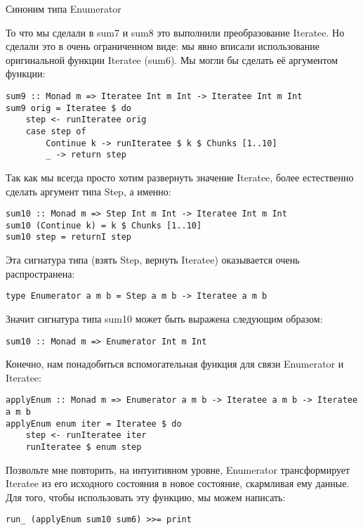 Синоним типа Enumerator

То что мы сделали в sum7 и sum8 это выполнили преобразование Iteratee. Но сделали это в очень ограниченном виде: мы явно вписали использование оригинальной функции Iteratee (sum6). Мы могли бы сделать её аргументом функции:

\begin{lstlisting}
sum9 :: Monad m => Iteratee Int m Int -> Iteratee Int m Int
sum9 orig = Iteratee $ do
    step <- runIteratee orig
    case step of
        Continue k -> runIteratee $ k $ Chunks [1..10]
        _ -> return step
\end{lstlisting}

Так как мы всегда просто хотим развернуть значение Iteratee, более естественно сделать аргумент типа Step, а именно:

\begin{lstlisting}
sum10 :: Monad m => Step Int m Int -> Iteratee Int m Int
sum10 (Continue k) = k $ Chunks [1..10]
sum10 step = returnI step
\end{lstlisting}

Эта сигнатура типа (взять Step, вернуть Iteratee) оказывается очень распространена:

\begin{lstlisting}
type Enumerator a m b = Step a m b -> Iteratee a m b
\end{lstlisting}

Значит сигнатура типа sum10 может быть выражена следующим образом:

\begin{lstlisting}
sum10 :: Monad m => Enumerator Int m Int
\end{lstlisting}

Конечно, нам понадобиться вспомогательная функция для связи Enumerator и Iteratee:

\begin{lstlisting}
applyEnum :: Monad m => Enumerator a m b -> Iteratee a m b -> Iteratee a m b
applyEnum enum iter = Iteratee $ do
    step <- runIteratee iter
    runIteratee $ enum step
\end{lstlisting}

Позвольте мне повторить, на интуитивном уровне, Enumerator трансформирует Iteratee из его исходного состояния в новое состояние, скармливая ему данные. Для того, чтобы использовать эту функцию, мы можем написать:

\begin{lstlisting}
run_ (applyEnum sum10 sum6) >>= print
\end{lstlisting}

